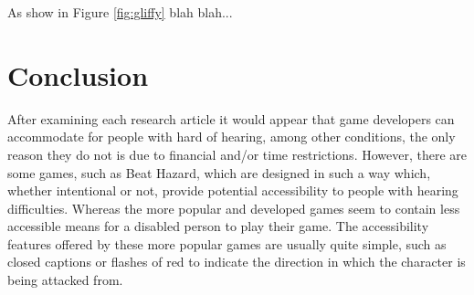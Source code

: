 \documentclass{scrartcl}
\begin{document}
As show in Figure \ref{fig:gliffy} blah blah...

\section{Conclusion}
After examining each research article it would appear that game developers can accommodate for people with hard of hearing, among other conditions, the only reason they do not is due to
financial and/or time restrictions. However, there are some games, such as Beat Hazard, which are designed in such a way which, whether intentional or not, provide potential accessibility to people with hearing difficulties. Whereas the more popular and developed games seem to contain less accessible means for a disabled person to play their game. The accessibility features offered by these more popular games are usually quite simple, such as closed captions or flashes of red to indicate the direction in which the character is being attacked from.



\end{document}
